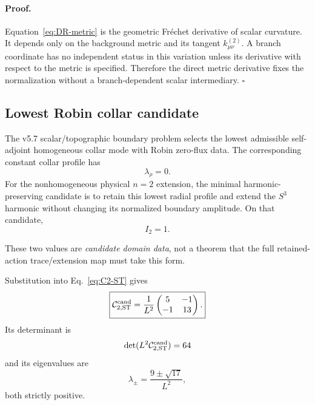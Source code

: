 \paragraph{Proof.}
Equation~\eqref{eq:DR-metric} is the geometric Fr\'echet derivative of scalar
curvature.  It depends only on the background metric and its tangent
$k_{\mu\nu}^{(2)}$.  A branch coordinate has no independent status in this
variation unless its derivative with respect to the metric is specified.
Therefore the direct metric derivative fixes the normalization without a
branch-dependent scalar intermediary. \hfill$\square$

\subsection{Lowest Robin collar candidate}

The v5.7 scalar/topographic boundary problem selects the lowest admissible
self-adjoint homogeneous collar mode with Robin zero-flux data.  The
corresponding constant collar profile has
\begin{equation}
\lambda_\rho=0.
\end{equation}
For the nonhomogeneous physical $n=2$ extension, the minimal
harmonic-preserving candidate is to retain this lowest radial profile and
extend the $S^3$ harmonic without changing its normalized boundary amplitude.
On that candidate,
\begin{equation}
I_2=1.
\end{equation}

These two values are \emph{candidate domain data}, not a theorem that the full
retained-action trace/extension map must take this form.

Substitution into Eq.~\eqref{eq:C2-ST} gives
\begin{equation}
\boxed{
\mathcal C_{2,\rm ST}^{\rm cand}
=
\frac1{L^2}
\begin{pmatrix}
5 & -1\\
-1 & 13
\end{pmatrix}.
}
\label{eq:C2-ST-candidate}
\end{equation}
Its determinant is
\begin{equation}
\det(L^2\mathcal C_{2,\rm ST}^{\rm cand})=64
\end{equation}
and its eigenvalues are
\begin{equation}
\boxed{
\lambda_\pm
=
\frac{9\pm\sqrt{17}}{L^2},
}
\label{eq:C2-ST-candidate-eigs}
\end{equation}
both strictly positive.

